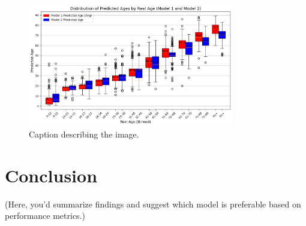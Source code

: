 \documentclass{article}
\begin{document}




\begin{figure}[h]
    \centering
    \includegraphics[width=0.8\textwidth]{images/3_Box_Real_vs_prediction_dorpnan_DensePlotGrid.png}
    \caption{Caption describing the image.}
    \label{fig:Box}
\end{figure}

\section{Conclusion}
(Here, you'd summarize findings and suggest which model is preferable based on performance metrics.)
\end{document}
